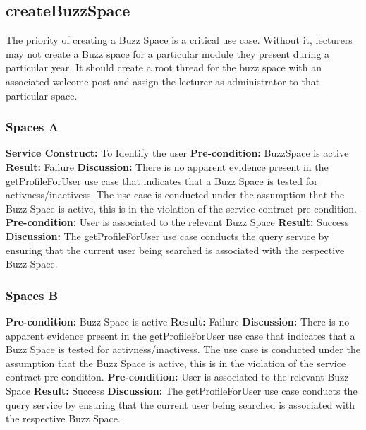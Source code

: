 
\subsection{createBuzzSpace}
The priority of creating a Buzz Space is a critical use case. Without it, lecturers may not create a Buzz space for a particular module they present during a particular year. It should create a root thread for the buzz space with an associated welcome post and assign the lecturer as administrator to that particular space.

\subsubsection{Spaces A}
\textbf{Service Construct:}  To Identify the user \newline
\textbf{Pre-condition:}  BuzzSpace is active \newline
\textbf{Result:}  Failure \newline
\textbf{Discussion:}  There is no apparent evidence present in the getProfileForUser use case that indicates that a Buzz Space is tested for activness/inactivess.
The use case is conducted under the assumption that the Buzz Space is active, this is in the violation of the service contract pre-condition. \newline \newline
\textbf{Pre-condition:}  User is associated to the relevant Buzz Space\newline
\textbf{Result:}  Success \newline
\textbf{Discussion:}  The getProfileForUser use case conducts the query service by ensuring that the current user being searched is associated with the respective Buzz Space.
\subsubsection{Spaces B}
\textbf{Pre-condition:}  Buzz Space is active \newline
\textbf{Result:}  Failure \newline
\textbf{Discussion:}  There is no apparent evidence present in the getProfileForUser use case that indicates that a Buzz Space is tested for activness/inactivess.
The use case is conducted under the assumption that the Buzz Space is active, this is in the violation of the service contract pre-condition. \newline \newline
\textbf{Pre-condition:}  User is associated to the relevant Buzz Space\newline
\textbf{Result:}  Success \newline
\textbf{Discussion:}  The getProfileForUser use case conducts the query service by ensuring that the current user being searched is associated with the respective Buzz Space.

